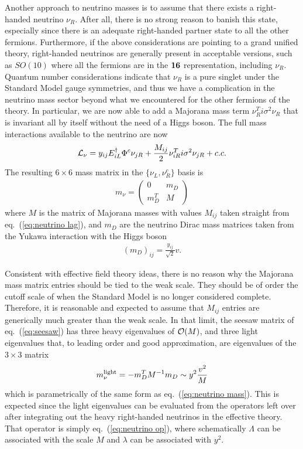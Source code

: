 \documentclass[12pt]{article}
\def\beq{\begin{eqnarray}}
\def\eeq{\end{eqnarray}}
\def\eq#1{eq.~(\ref{#1})}
\begin{document}
Another approach to neutrino masses is to assume that there exists a right-handed neutrino $\nu_R$. After all, there is no strong reason to banish this state, especially since there is an adequate right-handed partner state to all the other fermions. Furthermore, if the above considerations are pointing to a grand unified theory, right-handed neutrinos are generally present in acceptable versions, such as $SO(10)$ where all the fermions are in the ${\bf 16}$ representation, including $\nu_R$.  Quantum number considerations indicate that $\nu_R$ is a pure singlet under the Standard Model gauge symmetries, and thus we have a complication in the neutrino mass sector beyond what we encountered for the other fermions of the theory. In particular, we are now able to add a Majorana mass term $\nu_R^T i\sigma^2\nu_R$ that is invariant all by itself without the need of a Higgs boson. The full mass interactions available to the neutrino are now
\beq
{\cal L}_{\nu}=y_{ij} E^\dagger_{iL} \Phi^c \nu_{jR}+\frac{M_{ij}}{2}\nu^T_{iR} i\sigma^2\nu_{jR}+c.c.
\label{eq:neutrino lag}
\eeq
The resulting $6\times 6$ mass matrix in the $\{ \nu_L,\nu^c_R\}$ basis is
\beq
m_\nu=\left( \begin{array}{cc}
0 & m_D \\
m_D^T & M \end{array}\right)
\label{eq:seesaw}
\eeq
where $M$ is the matrix of Majorana masses with values $M_{ij}$ taken straight from \eq{eq:neutrino lag}, and $m_D$ are the neutrino Dirac mass matrices taken from the Yukawa interaction with the Higgs boson
\beq
(m_D)_{ij}=\frac{y_{ij}}{\sqrt{2}}v.
\eeq


Consistent with effective field theory ideas, there is no reason why the Majorana mass matrix entries should be tied to the weak scale. They should be of order the cutoff scale of when the Standard Model is no longer considered complete.  Therefore, it is reasonable and expected to assume that $M_{ij}$ entries are generically much greater than the weak scale. In that limit, the seesaw matrix of \eq{eq:seesaw} has three heavy eigenvalues of  ${\cal O}(M)$, and three light eigenvalues that, to leading order and good approximation, are eigenvalues of the $3\times 3$ matrix
\beq
m^{\rm light}_\nu=-m_D^T M^{-1}m_D\sim y^2 \frac{v^2}{M}
\eeq
which is parametrically of the same form as \eq{eq:neutrino mass}. This is expected since the light eigenvalues can be evaluated from the operators left over after integrating out the heavy right-handed neutrinos in the effective theory. That operator is simply \eq{eq:neutrino op}, where schematically $\Lambda$ can be associated with the scale $M$ and $\lambda$ can be associated with $y^2$.
\end{document}
